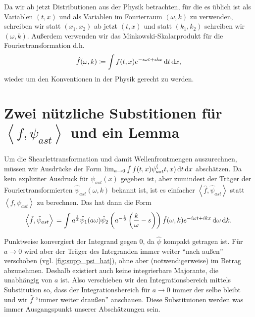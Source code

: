 
\begin{remark}[Notation]
    Da wir ab jetzt Distributionen aus der Physik betrachten, für die es üblich ist als Variablen $(t, x)$ und als Variablen im Fourierraum $(\omega, k)$ zu verwenden, schreiben wir statt $(x_1, x_2)$ ab jetzt $(t,x)$ und statt $(k_1, k_2)$ schreiben wir $(\omega, k)$. Außerdem verwenden wir das Minkowski-Skalarprodukt für die Fouriertransformation d.h.
    \begin{equation*}
        \hat f (\omega, k) \coloneqq \int f(t,x) e^{-i\omega t + i k x}
        \mathop{}\!\mathrm{d} t \mathop{}\!\mathrm{d} x
        ,
    \end{equation*}
    wieder um den Konventionen in der Physik gerecht zu werden.
\end{remark}

\section{\texorpdfstring{Zwei nützliche Substitionen für  $\left<f, \psi_{ast}\right>$ und ein Lemma}{Zwei nützliche Substitutionen und ein Lemma}}
\label{sec:substitutionen}

Um die Shearlettransformation und damit Wellenfrontmengen auszurechnen, müssen wir Ausdrücke der Form \(\lim_{a \to 0} \int f (t,x) \psi_{ast}^ (t,x) \mathop{}\!\mathrm{d} t \mathop{}\!\mathrm{d} x\) abschätzen. Da kein expliziter Ausdruck für $\psi_{ast}(x)$ gegeben ist, aber zumindest der Träger der Fouriertransformierten \(\hat \psi_{ast} (\omega, k)\) bekannt ist, ist es einfacher \(\left<\hat f, \hat \psi_{ast}\right>\) statt \(\left< f, \psi_{ast} \right>\) zu berechnen. Das hat dann die Form
\begin{equation}
    \left< \hat f, \hat\psi_{ast}\right> \\
    = \int a^{\frac{3}{4}} \hat \psi_1(a \omega)
    \hat \psi_2 \left(a^{-\frac{1}{2}} \left(\frac{k}{\omega} - s\right)\right)
    \hat f (\omega,k) e^{-i \omega t + ikx} \mathop{}\!\mathrm{d} \omega \mathop{}\!\mathrm{d} k.
\end{equation}

Punktweise konvergiert der Integrand gegen 0, da $\hat \psi$ kompakt getragen ist. Für $a \to 0$ wird aber der Träger des Integranden immer weiter "`nach außen"' verschoben (vgl. \cref{fig:supp_psi_hat}), ohne aber (notwendigerweise) im Betrag abzunehmen. Deshalb existiert auch keine integrierbare Majorante, die unabhängig von $a$ ist. Also verschieben wir den Integrationsbereich mittels Substitution so, dass der Integrationsbereich für $a \to 0$ immer der selbe bleibt und wir $\hat f$ "`immer weiter draußen"' anschauen. Diese Substituionen werden was immer Ausgangspunkt unserer Abschätzungen sein.

